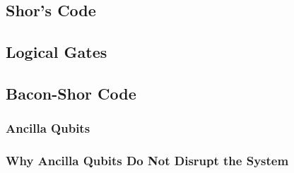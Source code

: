 \documentclass{article}
\begin{document}
\subsection{Shor's Code}
\label{sec:shorscode}
\subsection{Logical Gates}
\label{sec:logicalgates}
\subsection{Bacon-Shor Code}
\label{sec:baconshor}
\subsubsection{Ancilla Qubits}
\label{sec:ancillaqubits}
\subsubsection{Why Ancilla Qubits Do Not Disrupt the System}
\label{sec:ancilladisruption}
\end{document}
